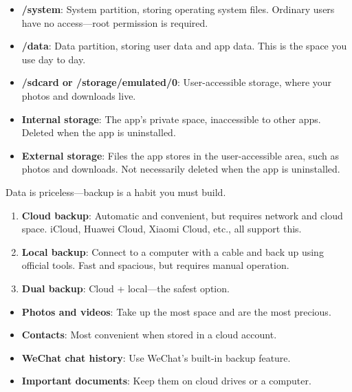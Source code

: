 
\begin{itemize}
  \item \textbf{/system}: System partition, storing operating system files. Ordinary users have no access—root permission is required.
  \item \textbf{/data}: Data partition, storing user data and app data. This is the space you use day to day.
  \item \textbf{/sdcard or /storage/emulated/0}: User-accessible storage, where your photos and downloads live.
\end{itemize}


\begin{itemize}
  \item \textbf{Internal storage}: The app's private space, inaccessible to other apps. Deleted when the app is uninstalled.
  \item \textbf{External storage}: Files the app stores in the user-accessible area, such as photos and downloads. Not necessarily deleted when the app is uninstalled.
\end{itemize}


Data is priceless—backup is a habit you must build.


\begin{enumerate}
  \item \textbf{Cloud backup}: Automatic and convenient, but requires network and cloud space. iCloud, Huawei Cloud, Xiaomi Cloud, etc., all support this.
  \item \textbf{Local backup}: Connect to a computer with a cable and back up using official tools. Fast and spacious, but requires manual operation.
  \item \textbf{Dual backup}: Cloud + local—the safest option.
\end{enumerate}


\begin{itemize}
  \item \textbf{Photos and videos}: Take up the most space and are the most precious.
  \item \textbf{Contacts}: Most convenient when stored in a cloud account.
  \item \textbf{WeChat chat history}: Use WeChat's built-in backup feature.
  \item \textbf{Important documents}: Keep them on cloud drives or a computer.
\end{itemize}


